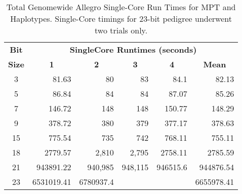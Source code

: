 \begin{table}[h]
\begin{center}
\begin{tabular}{crrrrr}\toprule
\textbf{Bit}  & \multicolumn{5}{c}{\textbf{SingleCore Runtimes (seconds)}}                                                                                                                                       \\
\textbf{Size} & \multicolumn{1}{c}{\textbf{1}} & \multicolumn{1}{c}{\textbf{2}} & \multicolumn{1}{c}{\textbf{3}} & \multicolumn{1}{c}{\textbf{4}} & \multicolumn{1}{c}{\textbf{Mean}} \\
\midrule
3             & 81.63                            & 80                               & 83                               & 84.1                             & 82.13                             \\
5             & 86.84                            & 84                               & 84                               & 87.07                            & 85.26                             \\
7             & 146.72                           & 148                              & 148                              & 150.77                           & 148.29                            \\
9             & 378.72                           & 380                              & 379                              & 377.17                           & 378.63                            \\
15            & 775.54                           & 735                              & 742                              & 768.11                           & 755.11                            \\
18            & 2779.57                          & 2,810                            & 2,795                            & 2758.11                          & 2785.59                           \\
21            & 943891.22                        & 940,985                          & 948,115                          & 946515.6                         & 944876.54                         \\
23            & 6531019.41                       & 6780937.4                        &                                  &                                  & 6655978.41                       \\
\hline
\end{tabular}
\end{center}
\vspace{-15pt}
\caption[Total Genome-wide Allegro Single-Core Run Times for MPT and Haplotypes]{Total Genomewide Allegro Single-Core Run Times for MPT and Haplotypes. Single-Core timings for 23-bit pedigree underwent two trials only.}\label{table:res:allegrosingleruntimes}
\end{table}


